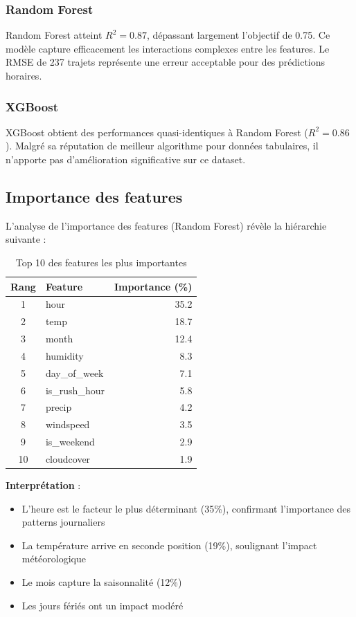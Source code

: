 \documentclass[12pt,a4paper]{article}
\begin{document}
\subsubsection{Random Forest}

Random Forest atteint $R^2 = 0.87$, dépassant largement l'objectif de 0.75. Ce modèle capture efficacement les interactions complexes entre les features. Le RMSE de 237 trajets représente une erreur acceptable pour des prédictions horaires.

\subsubsection{XGBoost}

XGBoost obtient des performances quasi-identiques à Random Forest ($R^2 = 0.86$). Malgré sa réputation de meilleur algorithme pour données tabulaires, il n'apporte pas d'amélioration significative sur ce dataset.

\subsection{Importance des features}

L'analyse de l'importance des features (Random Forest) révèle la hiérarchie suivante :

\begin{table}[H]
\centering
\caption{Top 10 des features les plus importantes}
\label{tab:importance}
\begin{tabular}{clr}
\toprule
\textbf{Rang} & \textbf{Feature} & \textbf{Importance (\%)} \\
\midrule
1 & hour & 35.2 \\
2 & temp & 18.7 \\
3 & month & 12.4 \\
4 & humidity & 8.3 \\
5 & day\_of\_week & 7.1 \\
6 & is\_rush\_hour & 5.8 \\
7 & precip & 4.2 \\
8 & windspeed & 3.5 \\
9 & is\_weekend & 2.9 \\
10 & cloudcover & 1.9 \\
\bottomrule
\end{tabular}
\end{table}

\textbf{Interprétation} :
\begin{itemize}
    \item L'heure est le facteur le plus déterminant (35\%), confirmant l'importance des patterns journaliers
    \item La température arrive en seconde position (19\%), soulignant l'impact météorologique
    \item Le mois capture la saisonnalité (12\%)
    \item Les jours fériés ont un impact modéré
\end{itemize}
\end{document}
